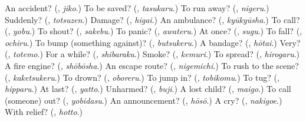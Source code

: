 \begin{tcolorbox}[breakable,colback=teal!4,colframe=teal!35!black,title={Before you move on}]
An accident? (\textbf{}, \emph{jiko}.) To be saved? (\textbf{}, \emph{tasukaru}.) To run away? (\textbf{}, \emph{nigeru}.) Suddenly? (\textbf{}, \emph{totsuzen}.) Damage? (\textbf{}, \emph{higai}.) An ambulance? (\textbf{}, \emph{kyūkyūsha}.) To call? (\textbf{}, \emph{yobu}.) To shout? (\textbf{}, \emph{sakebu}.) To panic? (\textbf{}, \emph{awateru}.) At once? (\textbf{}, \emph{sugu}.) To fall? (\textbf{}, \emph{ochiru}.) To bump (something against)? (\textbf{}, \emph{butsukeru}.) A bandage? (\textbf{}, \emph{hōtai}.) Very? (\textbf{}, \emph{totemo}.) For a while? (\textbf{}, \emph{shibaraku}.) Smoke? (\textbf{}, \emph{kemuri}.) To spread? (\textbf{}, \emph{hirogaru}.) A fire engine? (\textbf{}, \emph{shōbōsha}.) An escape route? (\textbf{}, \emph{nigemichi}.) To rush to the scene? (\textbf{}, \emph{kaketsukeru}.) To drown? (\textbf{}, \emph{oboreru}.) To jump in? (\textbf{}, \emph{tobikomu}.) To tug? (\textbf{}, \emph{hipparu}.) At last? (\textbf{}, \emph{yatto}.) Unharmed? (\textbf{}, \emph{buji}.) A lost child? (\textbf{}, \emph{maigo}.) To call (someone) out? (\textbf{}, \emph{yobidasu}.) An announcement? (\textbf{}, \emph{hōsō}.) A cry? (\textbf{}, \emph{nakigoe}.) With relief? (\textbf{}, \emph{hotto}.)
\end{tcolorbox}
